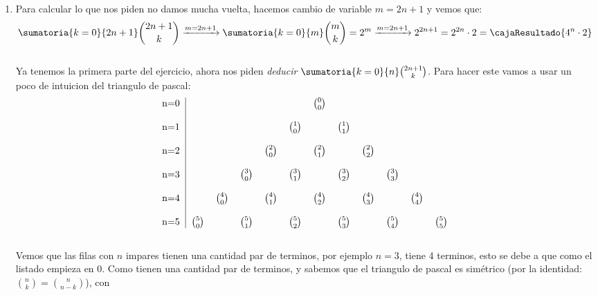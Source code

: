 \begin{enumerate}[label=\alph*)]
  \item
        Para calcular lo que nos piden no damos mucha vuelta, hacemos cambio de variable $m = 2n + 1$ y vemos que:
        \[
        \sumatoria{k=0}{2n + 1} \binom{2n+1}{k} \xrightarrow{m = 2n + 1} \sumatoria{k=0}{m} \binom{m}{k} = 2^m \xrightarrow{m = 2n + 1} 2^{2n + 1} = 2^{2n} \cdot 2 = \cajaResultado{4^n \cdot 2}
        \] \\
        Ya tenemos la primera parte del ejercicio, ahora nos piden \textit{deducir} $\sumatoria{k = 0}{n} \binom{2n + 1}{k}$. Para hacer este vamos a usar un poco de intuicion del triangulo de pascal:\\
        \[
        \begin{tabular}{c|ccccccccccc}
        n=0&  &     &     &     &      & $\binom{0}{0}$   &      &      &     &     & \\
        &  &     &     &     &      &     &      &      &     &     & \\
        n=1&  &     &     &     & $\binom{1}{0}$    &     &  $\binom{1}{1}$     &      &     &     & \\
        &  &     &     &     &      &     &      &      &     &     & \\
        n=2&  &     &     & $\binom{2}{0}$     &      & $\binom{2}{1}$     &      & $\binom{2}{2}$      &     &     & \\
        &  &     &     &     &      &     &      &      &     &     & \\
        n=3&  &     & $\binom{3}{0}$     &     & $\binom{3}{1}$      &     &  $\binom{3}{2}$     &      & $\binom{3}{3}$     &     & \\
        &  &     &     &     &      &     &      &      &     &     & \\
        n=4&  & $\binom{4}{0}$     &     & $\binom{4}{1}$     &      & $\binom{4}{2}$     &      & $\binom{4}{3}$      &     & $\binom{4}{4}$     & \\
        &  &     &     &     &      &     &      &      &     &     & \\
        n=5&$\binom{5}{0}$   &     &  $\binom{5}{1}$    &     &  $\binom{5}{2}$    &     & $\binom{5}{3}$     &      &  $\binom{5}{4}$    &     & $\binom{5}{5}$  
        \end{tabular}
        \] \\
        Vemos que las filas con $n$ impares tienen una cantidad par de terminos, por ejemplo $n = 3$, tiene 4 terminos, esto se debe a que como el listado empieza
        en $0$. Como tienen una cantidad par de terminos, y sabemos que el triangulo de pascal es simétrico (por la identidad: $\binom{n}{k} = \binom{n}{n - k}$), con 

\end{enumerate}
